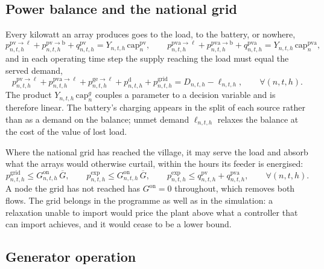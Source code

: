 \documentclass[11pt,a4paper]{article}
\theoremstyle{plain}
\theoremstyle{definition}
\begin{document}
\subsection{Power balance and the national grid}
\label{sec:balance}

Every kilowatt an array produces goes to the load, to the battery, or nowhere,
\begin{equation}
  p^{\mathrm{pv}\to\ell}_{n,t,h}+p^{\mathrm{pv}\to\mathrm{b}}_{n,t,h}+q^{\mathrm{pv}}_{n,t,h}
  = Y_{n,t,h}\,\mathrm{cap}^{\mathrm{pv}}_n,
  \qquad
  p^{\mathrm{pva}\to\ell}_{n,t,h}+p^{\mathrm{pva}\to\mathrm{b}}_{n,t,h}+q^{\mathrm{pva}}_{n,t,h}
  = Y_{n,t,h}\,\mathrm{cap}^{\mathrm{pva}}_n,
  \label{eq:pv-split}
\end{equation}
and in each operating time step the supply reaching the load must equal the served demand,
\begin{equation}
  p^{\mathrm{pv}\to\ell}_{n,t,h} + p^{\mathrm{pva}\to\ell}_{n,t,h}
  + p^{\mathrm{ge}\to\ell}_{n,t,h} + p^{\mathrm{d}}_{n,t,h} + p^{\mathrm{grid}}_{n,t,h}
  = D_{n,t,h} - \ell_{n,t,h},
  \qquad \forall (n,t,h).
  \label{eq:balance}
\end{equation}
The product $Y_{n,t,h}\,\mathrm{cap}^{g}_n$ couples a parameter to a decision variable and
is therefore linear. The battery's charging appears in the split of each source rather than
as a demand on the balance; unmet demand $\ell_{n,t,h}$ relaxes the balance at the cost of
the value of lost load.

Where the national grid has reached the village, it may serve the load and absorb what the
arrays would otherwise curtail, within the hours its feeder is energised:
\begin{equation}
  p^{\mathrm{grid}}_{n,t,h} \le G^{\mathrm{on}}_{n,t,h}\,\overline{G},
  \qquad
  p^{\mathrm{exp}}_{n,t,h} \le G^{\mathrm{on}}_{n,t,h}\,\overline{G},
  \qquad
  p^{\mathrm{exp}}_{n,t,h} \le q^{\mathrm{pv}}_{n,t,h}+q^{\mathrm{pva}}_{n,t,h},
  \qquad \forall (n,t,h).
  \label{eq:grid}
\end{equation}
A node the grid has not reached has $G^{\mathrm{on}}=0$ throughout, which removes both
flows. The grid belongs in the programme as well as in the simulation: a relaxation unable
to import would price the plant above what a controller that can import achieves, and it
would cease to be a lower bound.

\subsection{Generator operation}
\label{sec:generator}
\end{document}
